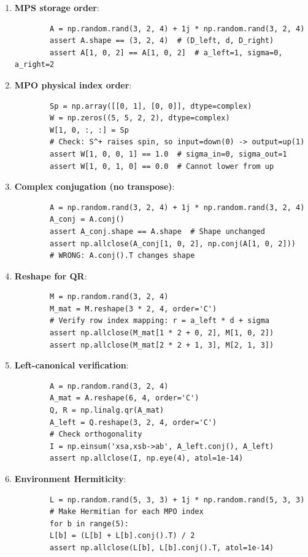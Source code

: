 \documentclass[aps,prb,onecolumn,scriptaddress]{revtex4-2}
\begin{document}
\begin{enumerate}
	\item \textbf{MPS storage order}:
	\begin{verbatim}
		A = np.random.rand(3, 2, 4) + 1j * np.random.rand(3, 2, 4)
		assert A.shape == (3, 2, 4)  # (D_left, d, D_right)
		assert A[1, 0, 2] == A[1, 0, 2]  # a_left=1, sigma=0, a_right=2
	\end{verbatim}
	
	\item \textbf{MPO physical index order}:
	\begin{verbatim}
		Sp = np.array([[0, 1], [0, 0]], dtype=complex)
		W = np.zeros((5, 5, 2, 2), dtype=complex)
		W[1, 0, :, :] = Sp
		# Check: S^+ raises spin, so input=down(0) -> output=up(1)
		assert W[1, 0, 0, 1] == 1.0  # sigma_in=0, sigma_out=1
		assert W[1, 0, 1, 0] == 0.0  # Cannot lower from up
	\end{verbatim}
	
	\item \textbf{Complex conjugation (no transpose)}:
	\begin{verbatim}
		A = np.random.rand(3, 2, 4) + 1j * np.random.rand(3, 2, 4)
		A_conj = A.conj()
		assert A_conj.shape == A.shape  # Shape unchanged
		assert np.allclose(A_conj[1, 0, 2], np.conj(A[1, 0, 2]))
		# WRONG: A.conj().T changes shape
	\end{verbatim}
	
	\item \textbf{Reshape for QR}:
	\begin{verbatim}
		M = np.random.rand(3, 2, 4)
		M_mat = M.reshape(3 * 2, 4, order='C')
		# Verify row index mapping: r = a_left * d + sigma
		assert np.allclose(M_mat[1 * 2 + 0, 2], M[1, 0, 2])
		assert np.allclose(M_mat[2 * 2 + 1, 3], M[2, 1, 3])
	\end{verbatim}
	
	\item \textbf{Left-canonical verification}:
	\begin{verbatim}
		A = np.random.rand(3, 2, 4)
		A_mat = A.reshape(6, 4, order='C')
		Q, R = np.linalg.qr(A_mat)
		A_left = Q.reshape(3, 2, 4, order='C')
		# Check orthogonality
		I = np.einsum('xsa,xsb->ab', A_left.conj(), A_left)
		assert np.allclose(I, np.eye(4), atol=1e-14)
	\end{verbatim}
	
	\item \textbf{Environment Hermiticity}:
	\begin{verbatim}
		L = np.random.rand(5, 3, 3) + 1j * np.random.rand(5, 3, 3)
		# Make Hermitian for each MPO index
		for b in range(5):
		L[b] = (L[b] + L[b].conj().T) / 2
		assert np.allclose(L[b], L[b].conj().T, atol=1e-14)
	\end{verbatim}
\end{enumerate}
\end{document}
